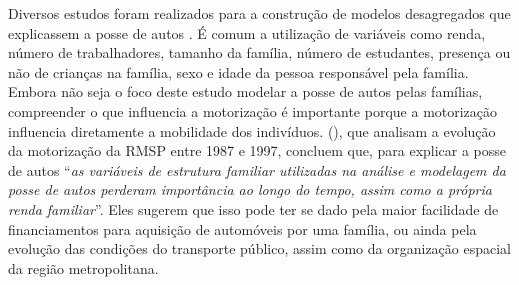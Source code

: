 \begin{table}[htb]
\centering

\end{table}

\clearpage
Diversos estudos foram realizados para a construção de modelos desagregados que explicassem a posse de autos
\cite{RYAN1999, DARGAY1999, DARGAY2001, CHU2002, KARLAFTIS2002, PFEIFFER2005}.
É comum a utilização de variáveis como renda, número de trabalhadores, tamanho da família, número de estudantes, presença ou não de crianças na família, sexo e idade da pessoa responsável pela família. Embora não seja o foco deste estudo modelar a posse de autos pelas famílias, compreender o que influencia a motorização é importante porque a motorização influencia diretamente a mobilidade dos indivíduos.
 (\citeyear{PFEIFFER2005}), que analisam a evolução da motorização da RMSP entre 1987 e 1997, concluem que, para explicar a posse de autos ``\textit{as variáveis de estrutura familiar utilizadas na análise e modelagem da posse de autos perderam importância ao longo do tempo, assim como a própria renda familiar}''. Eles sugerem que isso pode ter se dado pela maior facilidade de financiamentos para aquisição de automóveis por uma família, ou ainda pela evolução das condições do transporte público, assim como da organização espacial da região metropolitana.

